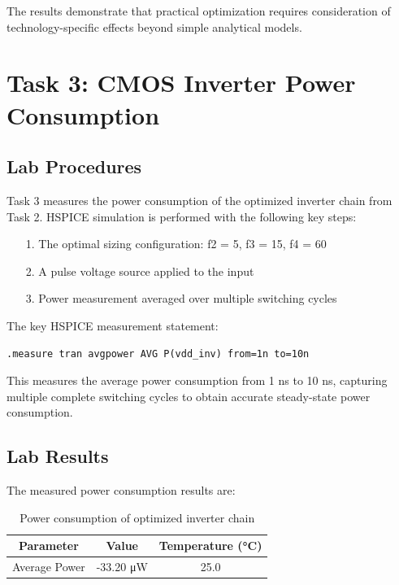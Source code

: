 \documentclass[UTF8,12pt,a4paper]{ctexart}
\begin{document}
The results demonstrate that practical optimization requires consideration of technology-specific effects beyond simple analytical models.

\newpage
\section{Task 3: CMOS Inverter Power Consumption}

\subsection{Lab Procedures}

Task 3 measures the power consumption of the optimized inverter chain from Task 2. HSPICE simulation is performed with the following key steps:

\begin{enumerate}
    \item[1. ] The optimal sizing configuration: f2 = 5, f3 = 15, f4 = 60
    \item[2. ] A pulse voltage source applied to the input
    \item[3. ] Power measurement averaged over multiple switching cycles
\end{enumerate}

The key HSPICE measurement statement:

\begin{lstlisting}
.measure tran avgpower AVG P(vdd_inv) from=1n to=10n
\end{lstlisting}

This measures the average power consumption from 1 ns to 10 ns, capturing multiple complete switching cycles to obtain accurate steady-state power consumption.

\subsection{Lab Results}

The measured power consumption results are:

\begin{table}[h]
\centering
\begin{tabular}{ccc}
\toprule
\textbf{Parameter} & \textbf{Value} & \textbf{Temperature (°C)} \\
\midrule
Average Power & -33.20 μW & 25.0 \\
\bottomrule
\end{tabular}
\caption{Power consumption of optimized inverter chain}
\end{table}
\end{document}
